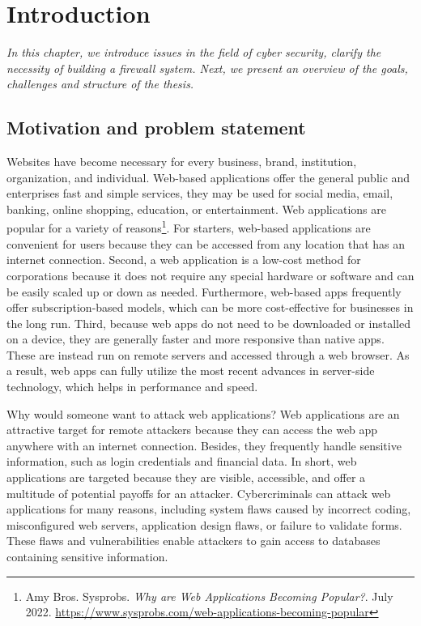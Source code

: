 \chapter{Introduction}
\label{chap:introduction} 
	\textit{\hspace{0.5cm}In this chapter, we introduce issues in the field of cyber security, clarify the necessity of building a firewall system. Next, we present an overview of the goals, challenges and structure of the thesis.}
\minitoc

\section{Motivation and problem statement}
\label{sec:motivation}
\hspace{0.5cm}Websites have become necessary for every business, brand, institution, organization, and individual. Web-based applications offer the general public and enterprises fast and simple services, they may be used for social media, email, banking, online shopping, education, or entertainment. Web applications are popular for a variety of reasons\footnote{Amy Bros. Sysprobs. \textit{Why are Web Applications Becoming Popular?}. July 2022. \url{https://www.sysprobs.com/web-applications-becoming-popular}}. For starters, web-based applications are convenient for users because they can be accessed from any location that has an internet connection. Second, a web application is a low-cost method for corporations because it does not require any special hardware or software and can be easily scaled up or down as needed. Furthermore, web-based apps frequently offer subscription-based models, which can be more cost-effective for businesses in the long run. Third, because web apps do not need to be downloaded or installed on a device, they are generally faster and more responsive than native apps. These are instead run on remote servers and accessed through a web browser. As a result, web apps can fully utilize the most recent advances in server-side technology, which helps in performance and speed. 

Why would someone want to attack web applications? Web applications are an attractive target for remote attackers because they can access the web app anywhere with an internet connection. Besides, they frequently handle sensitive information, such as login credentials and financial data. In short, web applications are targeted because they are visible, accessible, and offer a multitude of potential payoffs for an attacker. Cybercriminals can attack web applications for many reasons, including system flaws caused by incorrect coding, misconfigured web servers, application design flaws, or failure to validate forms. These flaws and vulnerabilities enable attackers to gain access to databases containing sensitive information. 


